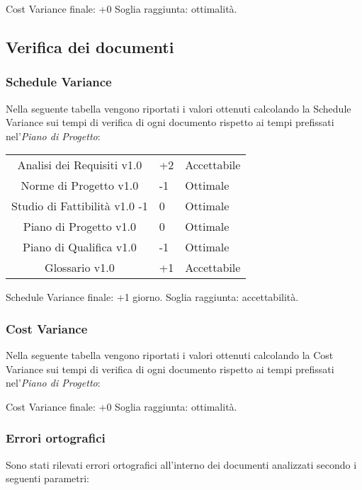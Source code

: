 Cost Variance finale: +0%
Soglia raggiunta: ottimalità.

\subsection{Verifica dei documenti}
\subsubsection{Schedule Variance}
Nella seguente tabella vengono riportati i valori ottenuti calcolando la Schedule Variance sui tempi di verifica di ogni documento rispetto ai tempi prefissati nel'\textit{Piano di Progetto}:

{
	\centering
	\begin{tabular}{| c | R{0.5cm} | C{3cm} |}
		\hline
		Analisi dei Requisiti v1.0 & +2 & Accettabile \\
		Norme di Progetto v1.0 & -1 & Ottimale \\
		Studio di Fattibilità v1.0 -1 &  0 &  Ottimale \\
		Piano di Progetto v1.0 &  0 &  Ottimale\\
		Piano di Qualifica v1.0 & -1 & Ottimale \\
		Glossario v1.0 & +1 & Accettabile\\	
		\hline
	\end{tabular}

}


Schedule Variance finale: +1 giorno.
Soglia raggiunta: accettabilità.

\subsubsection{Cost Variance}
Nella seguente tabella vengono riportati i valori ottenuti calcolando la Cost Variance sui tempi di verifica di ogni documento rispetto ai tempi prefissati nel'\textit{Piano di Progetto}:


Cost Variance finale: +0%
Soglia raggiunta: ottimalità.


\subsubsection{Errori ortografici}
Sono stati rilevati errori ortografici all'interno dei documenti analizzati secondo i seguenti parametri:

